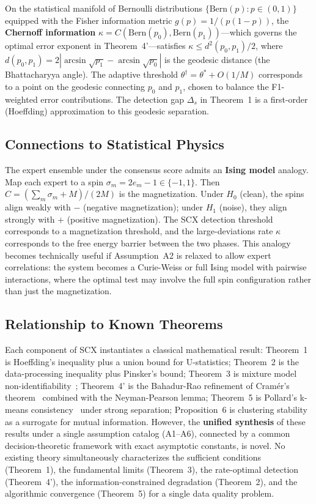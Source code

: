 \documentclass[twocolumn]{article}
\theoremstyle{definition}
\begin{document}
On the statistical manifold of Bernoulli distributions $\{\text{Bern}(p) : p \in (0,1)\}$ equipped with the Fisher information metric $g(p) = 1/(p(1-p))$, the \textbf{Chernoff information} $\kappa = C(\text{Bern}(p_0), \text{Bern}(p_1))$---which governs the optimal error exponent in Theorem~4'---satisfies $\kappa \leq d^2(p_0, p_1)/2$, where $d(p_0, p_1) = 2|\arcsin\sqrt{p_1} - \arcsin\sqrt{p_0}|$ is the geodesic distance (the Bhattacharyya angle). The adaptive threshold $\theta^\dagger = \theta^* + O(1/M)$ corresponds to a point on the geodesic connecting $p_0$ and $p_1$, chosen to balance the F1-weighted error contributions. The detection gap $\Delta_s$ in Theorem~1 is a first-order (Hoeffding) approximation to this geodesic separation.

\subsection{Connections to Statistical Physics}

The expert ensemble under the consensus score admits an \textbf{Ising model} analogy. Map each expert to a spin $\sigma_m = 2e_m - 1 \in \{-1, 1\}$. Then $C = (\sum_m \sigma_m + M)/(2M)$ is the magnetization. Under $H_0$ (clean), the spins align weakly with $-$ (negative magnetization); under $H_1$ (noise), they align strongly with $+$ (positive magnetization). The SCX detection threshold corresponds to a magnetization threshold, and the large-deviations rate $\kappa$ corresponds to the free energy barrier between the two phases. This analogy becomes technically useful if Assumption~A2 is relaxed to allow expert correlations: the system becomes a Curie-Weiss or full Ising model with pairwise interactions, where the optimal test may involve the full spin configuration rather than just the magnetization.

\subsection{Relationship to Known Theorems}

Each component of SCX instantiates a classical mathematical result: Theorem~1 is Hoeffding's inequality plus a union bound for U-statistics; Theorem~2 is the data-processing inequality plus Pinsker's bound; Theorem~3 is mixture model non-identifiability~\cite{teicher1963}; Theorem~4' is the Bahadur-Rao refinement of Cram\'{e}r's theorem~\cite{bahadur1960} combined with the Neyman-Pearson lemma; Theorem~5 is Pollard's k-means consistency~\cite{pollard1981} under strong separation; Proposition~6 is clustering stability as a surrogate for mutual information. However, the \textbf{unified synthesis} of these results under a single assumption catalog (A1--A6), connected by a common decision-theoretic framework with exact asymptotic constants, is novel. No existing theory simultaneously characterizes the sufficient conditions (Theorem~1), the fundamental limits (Theorem~3), the rate-optimal detection (Theorem~4'), the information-constrained degradation (Theorem~2), and the algorithmic convergence (Theorem~5) for a single data quality problem.
\end{document}
